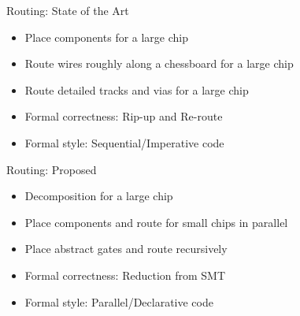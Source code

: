 \documentclass[9pt]{beamer}
\begin{document}
{ 
\begin{frame}[plain] 
\end{frame} 
} 

\begin{frame}{Routing: State of the Art}
	\begin{itemize}
        \setlength\itemsep{1em}
		\item Place components for a large chip
		\item Route wires roughly along a chessboard for a large chip
		\item Route detailed tracks and vias for a large chip
		\item Formal correctness: Rip-up and Re-route
		\item Formal style: Sequential/Imperative code
	\end{itemize}
\end{frame}

\begin{frame}{Routing: Proposed}
	\begin{itemize}
        \setlength\itemsep{1em}
		\item Decomposition for a large chip
		\item Place components and route for small chips in parallel
		\item Place abstract gates and route recursively
		\item Formal correctness: Reduction from SMT
		\item Formal style: Parallel/Declarative code
	\end{itemize}
\end{frame}
\end{document}
